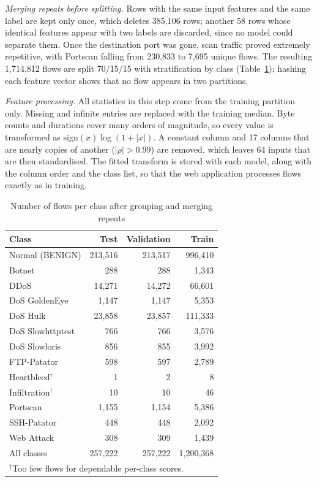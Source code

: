 \documentclass[conference]{IEEEtran}
\begin{document}
\textit{Merging repeats before splitting.} Rows with the same input features and the same label are
kept only once, which deletes 385,106 rows; another 58 rows whose identical features appear with
two labels are discarded, since no model could separate them. Once the destination port was gone,
scan traffic proved extremely repetitive, with Portscan falling from 230,833 to 7,695 unique flows.
The resulting 1,714,812 flows are split 70/15/15 with stratification by class
(Table~\ref{tab:classes}); hashing each feature vector shows that no flow appears in two partitions.

\textit{Feature processing.} All statistics in this step come from the training partition only.
Missing and infinite entries are replaced with the training median. Byte counts and durations cover
many orders of magnitude, so every value is transformed as $\mathrm{sign}(x)\log(1+|x|)$. A constant
column and 17 columns that are nearly copies of another ($|\rho|>0.99$) are removed, which leaves 64
inputs that are then standardised. The fitted transform is stored with each model, along with the
column order and the class list, so that the web application processes flows exactly as in training.

\begin{table}[t]
\caption{Number of flows per class after grouping and merging repeats}
\label{tab:classes}
\centering
\footnotesize
\begin{tabular}{lrrr}
\toprule
Class & Test & Validation & Train \\
\midrule
Normal (BENIGN) & 213,516 & 213,517 & 996,410 \\
Botnet & 288 & 288 & 1,343 \\
DDoS & 14,271 & 14,272 & 66,601 \\
DoS GoldenEye & 1,147 & 1,147 & 5,353 \\
DoS Hulk & 23,858 & 23,857 & 111,333 \\
DoS Slowhttptest & 766 & 766 & 3,576 \\
DoS Slowloris & 856 & 855 & 3,992 \\
FTP-Patator & 598 & 597 & 2,789 \\
Heartbleed$^\dagger$ & 1 & 2 & 8 \\
Infiltration$^\dagger$ & 10 & 10 & 46 \\
Portscan & 1,155 & 1,154 & 5,386 \\
SSH-Patator & 448 & 448 & 2,092 \\
Web Attack & 308 & 309 & 1,439 \\
\midrule
All classes & 257,222 & 257,222 & 1,200,368 \\
\bottomrule
\multicolumn{4}{l}{$^\dagger$Too few flows for dependable per-class scores.}
\end{tabular}
\end{table}
\end{document}
